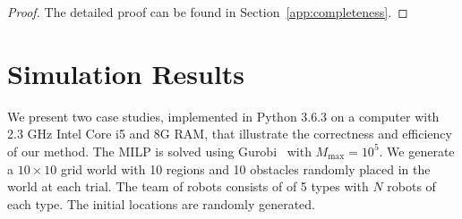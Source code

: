 \documentclass[Afour,sageh,times]{sagej}
\newtheorem{prop}[thm]{Proposition}
\begin{document}
{{\begin{proof}
The detailed proof can be found in Section~\ref{app:completeness}.
\end{proof}



\section{Simulation Results}\label{sec:sim}
We present two case studies, implemented in Python 3.6.3 on a computer with 2.3 GHz Intel Core i5 and 8G RAM, that illustrate the correctness and efficiency of our method. The MILP is solved using Gurobi~\citep{gurobi} with $M_{\text{max}}=10^5$. We generate a  $10\times 10$ grid world with 10 regions and 10 obstacles randomly placed in the world at each trial. The team of robots consists of of 5 types with $N$ robots of each type. The initial locations are randomly generated.

}}
\end{document}
